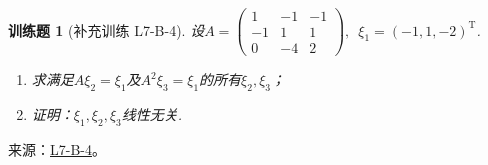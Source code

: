 \documentclass[UTF8,12pt,a4paper,fontset=fandol]{ctexart}
\newtheorem{exercise}{训练题}[section]
\begin{document}
\begin{exercise}[补充训练 L7-B-4]\label{prob:L7-B-4}
设$A=\begin{pmatrix}
                1 & -1 & -1 \\ -1 & 1 & 1 \\ 0 & -4 & 2
            \end{pmatrix},\enspace\xi_1=(-1,1,-2)^\mathrm{T}$.
        \begin{enumerate}
            \item 求满足$A\xi_2=\xi_1$及$A^2\xi_3=\xi_1$的所有$\xi_2,\xi_3$；

            \item 证明：$\xi_1,\xi_2,\xi_3$线性无关.
        \end{enumerate}
\end{exercise}
\noindent 来源：\href{https://github.com/yhwu-is/Linear-Algebra-Left-Undone/blob/new/%E8%AE%B2%E4%B9%89/%E4%B8%93%E9%A2%98/7%20%E7%BA%BF%E6%80%A7%E6%98%A0%E5%B0%84%E7%9F%A9%E9%98%B5%E8%A1%A8%E7%A4%BA%E4%B8%8E%E7%9F%A9%E9%98%B5%E8%BF%90%E7%AE%97%E5%9F%BA%E7%A1%80.tex}{L7-B-4}。
\end{document}
